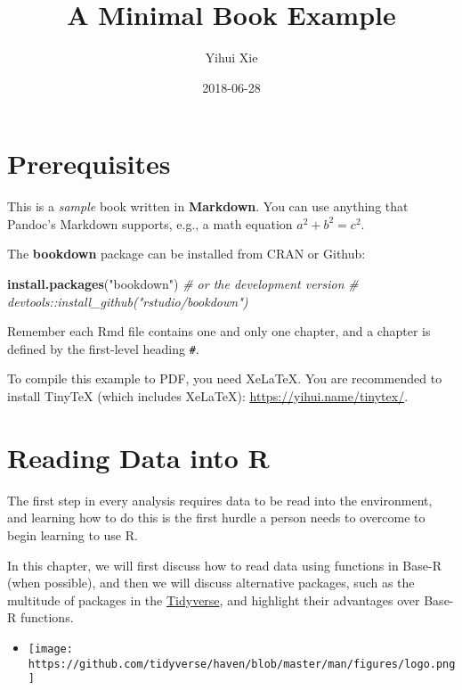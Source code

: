 \documentclass[]{book}
\title{A Minimal Book Example}
\author{Yihui Xie}
\date{2018-06-28}
\newenvironment{Shaded}{\begin{snugshade}}{\end{snugshade}}
\newcommand{\KeywordTok}[1]{\textcolor[rgb]{0.13,0.29,0.53}{\textbf{#1}}}
\newcommand{\StringTok}[1]{\textcolor[rgb]{0.31,0.60,0.02}{#1}}
\newcommand{\CommentTok}[1]{\textcolor[rgb]{0.56,0.35,0.01}{\textit{#1}}}
\newcommand{\NormalTok}[1]{#1}
\providecommand{\tightlist}{%
  \setlength{\itemsep}{0pt}\setlength{\parskip}{0pt}}
\theoremstyle{definition}
\theoremstyle{definition}
\theoremstyle{definition}
\theoremstyle{remark}
\begin{document}
\maketitle

{
\setcounter{tocdepth}{1}
\tableofcontents
}
\chapter{Prerequisites}\label{prerequisites}

This is a \emph{sample} book written in \textbf{Markdown}. You can use
anything that Pandoc's Markdown supports, e.g., a math equation
\(a^2 + b^2 = c^2\).

The \textbf{bookdown} package can be installed from CRAN or Github:

\begin{Shaded}
\begin{Highlighting}[]
\KeywordTok{install.packages}\NormalTok{(}\StringTok{"bookdown"}\NormalTok{)}
\CommentTok{# or the development version}
\CommentTok{# devtools::install_github("rstudio/bookdown")}
\end{Highlighting}
\end{Shaded}

Remember each Rmd file contains one and only one chapter, and a chapter
is defined by the first-level heading \texttt{\#}.

To compile this example to PDF, you need XeLaTeX. You are recommended to
install TinyTeX (which includes XeLaTeX):
\url{https://yihui.name/tinytex/}.

\chapter{Reading Data into R}\label{reading-data-into-r}

The first step in every analysis requires data to be read into the
environment, and learning how to do this is the first hurdle a person
needs to overcome to begin learning to use R.

In this chapter, we will first discuss how to read data using functions
in Base-R (when possible), and then we will discuss alternative
packages, such as the multitude of packages in the
\href{https://www.tidyverse.org}{Tidyverse}, and highlight their
advantages over Base-R functions.

\begin{itemize}
\tightlist
\item
  \texttt{[image: https://github.com/tidyverse/haven/blob/master/man/figures/logo.png]}
\end{itemize}
\end{document}

